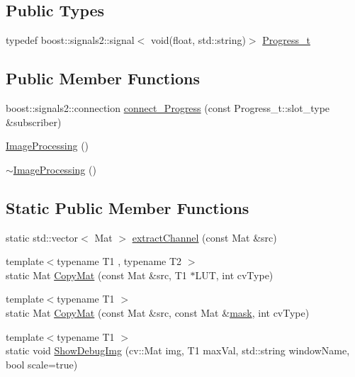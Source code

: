 \subsection*{Public Types}
\begin{DoxyCompactItemize}
\item 
typedef boost\+::signals2\+::signal$<$ void(float, std\+::string)$>$ \hyperlink{class_vision_1_1_image_processing_a8aada262447aa24be36586ea9d188930}{Progress\+\_\+t}
\end{DoxyCompactItemize}
\subsection*{Public Member Functions}
\begin{DoxyCompactItemize}
\item 
boost\+::signals2\+::connection \hyperlink{class_vision_1_1_image_processing_a013b9623c6a2933ec5f78b13a450994d}{connect\+\_\+\+Progress} (const Progress\+\_\+t\+::slot\+\_\+type \&subscriber)
\item 
\hyperlink{class_vision_1_1_image_processing_a0090ffe36a912d6df5d7a1f507f6252e}{Image\+Processing} ()
\item 
\hyperlink{class_vision_1_1_image_processing_a1d4bd00ec1862112552c663034cebabc}{$\sim$\+Image\+Processing} ()
\end{DoxyCompactItemize}
\subsection*{Static Public Member Functions}
\begin{DoxyCompactItemize}
\item 
static std\+::vector$<$ Mat $>$ \hyperlink{class_vision_1_1_image_processing_ad5fa51caaabb8cb0fc2c15f645695a3c}{extract\+Channel} (const Mat \&src)
\item 
{\footnotesize template$<$typename T1 , typename T2 $>$ }\\static Mat \hyperlink{class_vision_1_1_image_processing_a16f96c26c7c5c6feb7ac103b9b478682}{Copy\+Mat} (const Mat \&src, T1 $\ast$L\+U\+T, int cv\+Type)
\item 
{\footnotesize template$<$typename T1 $>$ }\\static Mat \hyperlink{class_vision_1_1_image_processing_a5a255d7f5b10bcb199e66d1e00ab9d1a}{Copy\+Mat} (const Mat \&src, const Mat \&\hyperlink{_gen_blob_8m_a2f6787d513f2bdbca6833c1c1ee04329}{mask}, int cv\+Type)
\item 
{\footnotesize template$<$typename T1 $>$ }\\static void \hyperlink{class_vision_1_1_image_processing_a97407ef83de37496d30d6defe3165edd}{Show\+Debug\+Img} (cv\+::\+Mat img, T1 max\+Val, std\+::string window\+Name, bool scale=true)
\end{DoxyCompactItemize}

